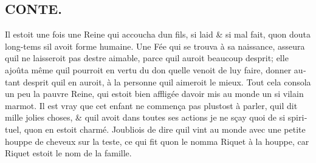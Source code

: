 \documentclass[14pt,a4paper]{memoir}
\newcommand{\notesection}[1]{%
  \addtonotes{\protect\par\protect\vspace{2ex}\protect\noindent\textbf{#1}\protect\par\protect\vspace{1ex}}%
}
\begin{document}
{{\begin{otherlanguage}{french}
\section{CONTE.}
\notesection{CONTE.}

Il estoit une fois une Reine qui accoucha d\textquotesingle un fils, si
laid \& si mal fait, qu\textquotesingle on douta long-tems
s\textquotesingle il avoit forme humaine. Une Fée qui se trouva à sa
naissance, asseura qu\textquotesingle il ne laisseroit pas
d\textquotesingle estre aimable, parce qu\textquotesingle il auroit
beaucoup d\textquotesingle esprit; elle ajoûta même
qu\textquotesingle il pourroit en vertu du don qu\textquotesingle elle
venoit de luy faire, donner autant d\textquotesingle esprit
qu\textquotesingle il en auroit, à la personne qu\textquotesingle il
aimeroit le mieux. Tout cela consola un peu la pauvre Reine, qui estoit
bien affligée d\textquotesingle avoir mis au monde un si vilain marmot.
Il est vray que cet enfant ne commença pas plustost à parler,
qu\textquotesingle il dit mille jolies choses, \& qu\textquotesingle il
avoit dans toutes ses actions je ne sçay quoi de si spirituel,
qu\textquotesingle on en estoit charmé. J\textquotesingle oubliois de
dire qu\textquotesingle il vint au monde avec une petite houppe de
cheveux sur la teste, ce qui fit qu\textquotesingle on le nomma Riquet à
la houppe, car Riquet estoit le nom de la famille.


\end{otherlanguage}}}
\end{document}

